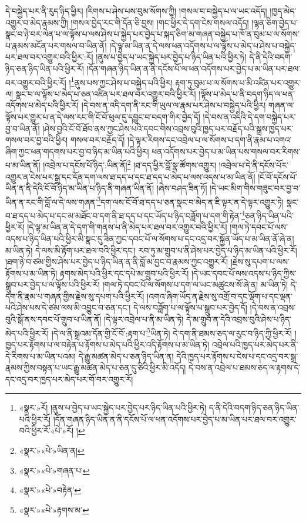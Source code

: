 དེ་བསྐྱེད་པར་ནི་རུད་ཉིད་ཕྱིར། །རིགས་པ་ཤེས་པས་བུམ་སོགས་ཀྱི། །གསལ་བ་བསྐྱེད་པ་ལ་ཡང་འདོད། །ཁྱད་མེད་འགྱུར་བ་མེད་རྣམས་ཀྱི། །གསལ་བྱེད་རང་གི་དོན་ཅི་བྱས། །གང་ཕྱིར་དེ་དག་ངེས་གསལ་འདོད། །ལྷན་ཅིག་བྱེད་པ་སྣང་བ་ཉེ་བར་ལེན་པ་ལ་ལྟོས་པ་ལས་ཤེས་པ་སྐྱེད་པར་བྱེད་པ་སྐད་ཅིག་མ་གཞན་བསྐྱེད་པ་ཁོ་ན་བུམ་པ་ལ་སོགས་པ་རྣམས་མངོན་པར་གསལ་བ་ཡིན་ནོ། །དེ་ལྟ་མ་ཡིན་ན་དེ་ལས་ཕན་འདོགས་པ་ལ་ལྟོས་པ་མེད་པ་ཤེས་པ་བསྐྱེད་པར་ཐལ་བར་འགྱུར་བའི་ཕྱིར་:རོ། །ནུས་པ་བྱེད་པ་ཡང་སྐྱེད་པར་བྱེད་པ་ཉིད་ཡིན་པའི་ཕྱིར་ཏེ། དེ་ནི་དེའི་བདག་ཉིད་ཅན་ཉིད་ཡིན་པའི་ཕྱིར་རོ། །དོན་གཞན་ཉིད་ཡིན་ན་ནི་དངོས་པོ་ལ་ཕན་འདོགས་པར་བྱེད་པ་མ་ཡིན་པར་ཐལ་བར་འགྱུར་བའི་ཕྱིར་རོ། །\footnote{«སྣར་»རོ། །ནུས་པ་བྱེད་པ་ཡང་སྐྱེད་པར་བྱེད་པར་ཉིད་ཡིན་པའི་ཕྱིར་ཏེ། ད་ནི་དེའི་བདག་ཉིད་ཅན་ཉིད་ཡིན་པའི་ཕྱིར་རོ། །དོན་གཞན་ཉིད་ཡིན་ན་ནི་དངོས་པོ་ལ་ཕན་འདོགས་པར་བྱེད་པ་མ་ཡིན་པར་ཐལ་བར་འགྱུར་བའི་ཕྱིར་རོ་«པེ་»རོ། །}ནུས་པས་ཀྱང་ཤེས་པ་བསྐྱེད་པའི་ཕྱིར། རྟག་ཏུ་བུམ་པ་ལ་སོགས་པ་མི་འཛིན་པར་འགྱུར་ལ། སྣང་བ་ལ་ལྟོས་པ་མེད་པ་ཅན་འཛིན་པར་ཐལ་བར་འགྱུར་བའི་ཕྱིར་རོ། །ལྟོས་པ་མེད་པ་ནི་བདག་ཉིད་ལ་ཕན་འདོགས་པ་མེད་པའི་ཕྱིར་རོ། །དེ་བས་ན་འདི་དག་ནི་རང་གི་ཡུལ་ལ་རྣམ་པར་ཤེས་པ་བསྐྱེད་པའི་ཕྱིར། གཞན་ལ་ལྟོས་པར་གྱུར་པ་ན་དེ་ལས་རང་གི་ངོ་བོ་ཕུལ་དུ་དབྱུང་བ་བདག་གིར་བྱེད་དོ། །དེ་བས་ན་འདིའི་དེ་དག་བསྐྱེད་པར་བྱ་བ་ཡིན་ནོ། །ཤེས་བྱའི་ངོ་བོ་ཐོབ་ནས་ཀྱང་ཤེས་པའི་དབང་གིས་འབྲས་བུའི་ཁྱད་པར་བརྗོད་པའི་སྒྲས་ཁྱད་པར་གསལ་བར་བྱ་བའི་ཕྱིར། གསལ་བར་བརྗོད་དོ། །དེ་ལྟར་རིགས་དང་འབྲེལ་པ་ལ་སོགས་པ་དག་ནི་རྣམ་པ་འགའ་ཞིག་ཀྱང་ཕན་གདགས་པར་བྱ་བ་ཉིད་མ་ཡིན་པའི་ཕྱིར། ཕན་འདོགས་པར་བྱེད་པ་མ་ཡིན་པས་གསལ་བར་རིགས་པ་མ་ཡིན་ནོ། །འབྲེལ་པ་དངོས་པོ་ཉིད་:ཡིན་ནོ།\footnote{«སྣར་»«པེ་»ཡིན་ན།} །ཐ་དད་ཕྱིར་བློ་སྣ་ཚོགས་འགྱུར། །འབྲེལ་པ་དེ་ནི་དངོས་པོར་འགྱུར་ན་ངེས་པར་སྒྲ་དང་དོན་དག་ལས་ཐ་དད་པ་དང་ཐ་དད་པ་མེད་པ་ལས་འདས་པ་མ་ཡིན་ནོ། །ངོ་བོ་དངོས་པོ་ཡིན་ན་ནི་དེའི་ངོ་བོ་ཉིད་མ་ཡིན་པ་ཉིད་ནི་གཞན་ཡིན་ནོ། །ཞེས་བཤད་ཟིན་ཏོ། །དེ་ཡང་མིག་གིས་གཟུང་བར་བྱ་བ་ཡིན་ན་རང་གི་བློ་ལ་དེ་ལས་གཞན་\footnote{«སྣར་»«པེ་»གཞན་པ་}དག་ལས་ངོ་བོ་ཐ་དད་པ་ཅན་སྣང་བ་མེད་ན་ཇི་ལྟར་ན་དེ་ལྟར་འགྱུར་ཏེ། སྣང་བ་ཐ་དད་པ་མེད་པ་དང་མ་མཐོང་བ་དག་ནི་ཐ་དད་པ་དང་ཡོད་པ་ཉིད་བཟློག་པ་དག་གི་རྟེན་\footnote{«སྣར་»«པེ་»བརྟེན་}ཅན་ཉིད་ཡིན་པའི་ཕྱིར་རོ། །དེ་ལྟ་མ་ཡིན་ན་དེ་དག་གི་གནས་པ་ནི་མེད་པར་ཐལ་བར་འགྱུར་བའི་ཕྱིར་རོ། །གལ་ཏེ་དབང་པོ་ལས་འདས་པ་ཉིད་ཡིན་པའི་ཕྱིར་མི་སྣང་དུ་ཟིན་ཀྱང་དབང་པོ་ལ་སོགས་པ་དང་འདྲ་བར་སྐྱོན་ཡོད་པ་མ་ཡིན་ནོ་ཞེ་ན། མ་ཡིན་ཏེ། དེ་ལས་མི་རྟོག་པར་ཐལ་བའི་ཕྱིར་དང་། རབ་ཏུ་མ་གྲུབ་པ་ནི་ཤེས་པར་བྱེད་པ་ཉིད་མ་ཡིན་པའི་ཕྱིར་རོ། །ཐག་ཉེ་བ་ཙམ་གྱིས་ཤེས་པར་བྱེད་པ་ཉིད་ཡིན་ན་ནི་བློ་མ་བྱང་བ་རྣམས་ཀྱང་འགྱུར་རོ། །རྗེས་སུ་དཔག་པ་ལས་རྟོགས་པ་མ་ཡིན་ཏེ། རྟགས་མེད་པའི་ཕྱིར་དང་དཔེ་མ་གྲུབ་པའི་ཕྱིར་རོ། །དེ་ཡང་དབང་པོ་ལས་འདས་པ་ཉིད་ཀྱིས་སྒྲུབ་པར་བྱེད་པ་ལ་ལྟོས་པའི་ཕྱིར་རོ། །གལ་ཏེ་དབང་པོ་ལ་སོགས་པ་དག་ལ་ཡང་མཚུངས་སོ་ཞེ་ན། མ་ཡིན་ཏེ། དེ་དག་ནི་རྣམ་པ་གཞན་གྱིས་རྗེས་སུ་དཔག་པའི་ཕྱིར་རོ། །འགའ་ཞིག་ཡོད་ན་རྗེས་སུ་འགྲོ་བ་དང་ལྡོག་པ་དང་ལྡན་པའི་ཤེས་པས་དེ་ཙམ་ལས་མི་འབྱུང་བ་ཅན་དང་། དེ་ལས་བཟློག་པ་ལ་ལྟོས་པ་སྒྲུབ་པར་བྱེད་དོ། །དེ་བས་ན་འབྲས་བུའི་སྒོ་ནས་དབང་པོ་གྲུབ་པ་ཡིན་ནོ། །དེ་ལྟར་འབྲེལ་པ་ནི་མ་ཡིན་ཏེ། དེ་མ་གྲུབ་ན་དེའི་འབྲས་བུའི་ཤེས་པ་ཉིད་མེད་པའི་ཕྱིར་རོ། །དེ་ལ་ནི་སྒྲའམ་དོན་གྱི་ངོ་བོ་:རྟག་པ་\footnote{«སྣར་»«པེ་»རྟགས་མ་}ཡིན་ཏེ། དེ་དག་ནི་ཐམས་ཅད་ལ་རུང་བ་ཉིད་ཀྱི་ཕྱིར་རོ། །ཁྱད་པར་རྟོགས་པ་ལ་བརྟེན་པ་རྟོགས་པ་མེད་པའི་ཕྱིར་འདི་རྟོགས་པ་མ་ཡིན་ཏེ། འབྲེལ་པའི་ཁྱད་པར་མེད་པར་ནི་དེ་རིགས་པ་མ་ཡིན་པའམ། དེ་རྒྱུ་མཚན་མེད་པ་ཅན་ཉིད་ཡིན་ན། དེའི་ཁྱད་པར་རྟོགས་པ་ངེས་པ་དང་འདྲ་བར་སྒྲ་རྣམས་ཀྱིས་བསྟན་པ་ཡང་རྒྱུ་མཚན་མེད་པ་ཅན་དུ་ཅིའི་ཕྱིར་མི་འདོད། དེ་བས་ན་འབྲེལ་པ་ཐམས་ཅད་ལ་རྟགས་དེ་དང་འདྲ་བར་ཁྱད་པར་མེད་པར་གོ་བར་འགྱུར་རོ། 